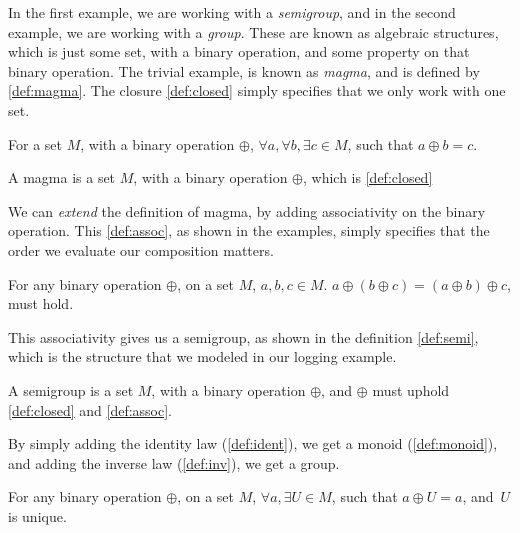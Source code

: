 In the first example, we are working with a \textit{semigroup}, and in the
second example, we are working with a \textit{group}. These are known as
algebraic structures, which is just some set, with a binary operation, and some
property on that binary operation. The trivial example, is known as
\textit{magma}, and is defined by \ref{def:magma}. The closure \ref{def:closed}
simply specifies that we only work with one set.

\begin{definition}[Closure] \label{def:closed}
  For a set $M$, with a binary operation $\oplus$,
  $\forall a, \forall b, \exists c \in M$, such that
  $a \oplus b = c$.
\end{definition}

\begin{definition}[Magma] \label{def:magma}
  A magma is a set $M$, with a binary operation $\oplus$, which is
  \ref{def:closed}
\end{definition}

We can \textit{extend} the definition of magma, by adding associativity on the
binary operation. This \ref{def:assoc}, as shown in the examples, simply
specifies that the order we evaluate our composition matters.

\begin{definition} \label{def:assoc}
  For any binary operation $\oplus$, on a set $M$, $a, b, c \in M$.
  $a \oplus \left ( b \oplus c \right ) = \left ( a \oplus b \right ) \oplus c$,
  must hold.
\end{definition}

This associativity gives us a semigroup, as shown in the definition
\ref{def:semi}, which is the structure that we modeled in our logging example.

\begin{definition}[Semigroup] \label{def:semi}
  A semigroup is a set $M$, with a binary operation $\oplus$, and $\oplus$ must
  uphold \ref{def:closed} and \ref{def:assoc}.
\end{definition}

By simply adding the identity law (\ref{def:ident}), we get a
monoid (\ref{def:monoid}), and adding the inverse law
(\ref{def:inv}), we get a group.

\begin{definition} \label{def:ident}
  For any binary operation $\oplus$, on a set $M$,
  $\forall a, \exists U \in M$, such that
  $a \oplus U = a$, and $U$ is unique.
\end{definition}

